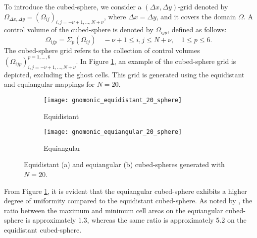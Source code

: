 To introduce the cubed-sphere, we consider a $(\Delta x, \Delta y)$-grid denoted by 
$\Omega_{\Delta x, \Delta y} = (\Omega_{ij})_{i,j=-\nu+1,\ldots,N+\nu}$, 
where $\Delta x = \Delta y$, and it covers the domain $\Omega$. 
A control volume of the cubed-sphere is denoted by $\Omega_{ijp}$, defined as follows:
\begin{equation*}
	\Omega_{ijp} = \Sigma_p(\Omega_{ij})
	\quad -\nu+1 \leq i, j \leq N+\nu, \quad 1 \leq p \leq 6.
\end{equation*}
The cubed-sphere grid refers to the collection of control volumes 
$(\Omega_{ijp})_{i,j=-\nu+1,\ldots,N+\nu}^{p=1,\ldots,6}$. 
In Figure \ref{chp4-cs-grid}, an example of the cubed-sphere grid is depicted,
excluding the ghost cells. This grid is generated using the equidistant and equiangular mappings for $N=20$.
\begin{figure}[!htb]
	\centering
	\begin{subfigure}{0.48\textwidth}
		\centering
		\texttt{[image: gnomonic\_equidistant\_20\_sphere]}
		\caption{Equidistant}
	\end{subfigure}
	\begin{subfigure}{0.48\textwidth}
		\centering
		\texttt{[image: gnomonic\_equiangular\_20\_sphere]}
		\caption{Equiangular}
	\end{subfigure}
	\caption{Equidistant (a) and equiangular (b) cubed-spheres generated with $N=20$.
		\label{chp4-cs-grid}}
\end{figure}

From Figure \ref{chp4-cs-grid}, it is evident that the equiangular cubed-sphere
exhibits a higher degree of uniformity compared to the equidistant cubed-sphere.
As noted by \citet{rancic:1996}, the ratio between the maximum and minimum cell
areas on the equiangular cubed-sphere is approximately 1.3,
whereas the same ratio is approximately 5.2 on the equidistant cubed-sphere. 

